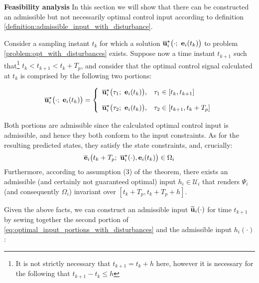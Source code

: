 
\textbf{Feasibility analysis}
In this section we will show that there can be constructed an admissible
but not necessarily optimal control input according to definition
\eqref{definition:admissible_input_with_disturbance}.

Consider a sampling instant $t_k$ for which a
solution $\overline{\vect{u}}_i^{\star}\big(\cdot;\ \vect{e}_i(t_k)\big)$ to
problem \eqref{problem:opt_with_disturbances} exists.
Suppose now a time instant $t_{k+1}$ such that\footnote{It is not strictly necessary
that $t_{k+1} = t_k + h$ here, however it is necessary for the following that
$t_{k+1} - t_k \leq h$} $t_k < t_{k+1} < t_k + T_p$, and consider that the
optimal control signal calculated at $t_k$ is comprised by the following two
portions:

\begin{equation}
  \overline{\vect{u}}_i^{\star}\big(\cdot;\ \vect{e}_i(t_k)\big) = \left\{
      \begin{array}{ll}
        \overline{\vect{u}}_i^{\star}\big(\tau_1;\ \vect{e}_i(t_k)\big), & \tau_1 \in [t_k, t_{k+1}] \\[2.5ex]
        \overline{\vect{u}}_i^{\star}\big(\tau_2;\ \vect{e}_i(t_k)\big), & \tau_2 \in [t_{k+1}, t_k + T_p]
      \end{array}
      \right.
  \label{eq:optimal_input_portions_with_disturbances}
\end{equation}

Both portions are admissible since the calculated optimal control input is
admissible, and hence they both conform to the input constraints.
As for the resulting predicted states, they satisfy the state constraints, and,
crucially:
\begin{align}
  \overline{\vect{e}}_i\big(t_k + T_p;\ \overline{\vect{u}}_i^{\star}(\cdot), \vect{e}_i(t_k)\big) \in \Omega_i
  \label{eq:predicted_t_k_T_p_from_t_k_in_omega}
\end{align}
Furthermore, according to assumption (3) of the theorem, there exists an
admissible (and certainly not guaranteed optimal) input
$h_i \in \mathcal{U}_i$ that renders $\Psi_i$
(and consequently $\Omega_i$) invariant over $[t_k + T_p, t_k + T_p + h]$.

Given the above facts, we can construct an admissible input
$\widetilde{\bm{\mathbf{u}}}_i(\cdot)$  for time $t_{k+1}$ by sewing together the second
portion of \eqref{eq:optimal_input_portions_with_disturbances} and the
admissible input $h_i(\cdot)$:

